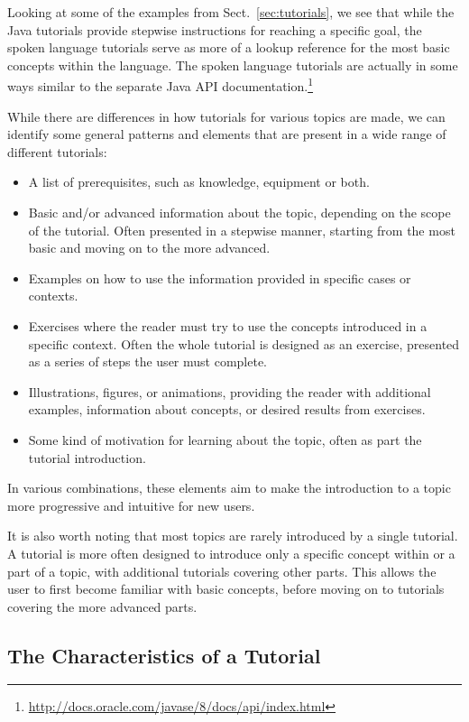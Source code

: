 \noindent
Looking at some of the examples from Sect.~\ref{sec:tutorials}, we see that while the Java tutorials provide stepwise instructions for reaching a specific goal, the spoken language tutorials serve as more of a lookup reference for the most basic concepts within the language. The spoken language tutorials are actually in some ways similar to the separate Java API documentation.\footnote{\url{http://docs.oracle.com/javase/8/docs/api/index.html}}

\noindent
While there are differences in how tutorials for various topics are made, we can identify some general patterns and elements that are present in a wide range of different tutorials:
\begin{itemize}
	\item A list of prerequisites, such as knowledge, equipment or both.
	\item Basic and/or advanced information about the topic, depending on the scope of the tutorial. Often presented in a stepwise manner, starting from the most basic and moving on to the more advanced.
	\item Examples on how to use the information provided in specific cases or contexts.
	\item Exercises where the reader must try to use the concepts introduced in a specific context. Often the whole tutorial is designed as an exercise, presented as a series of steps the user must complete.
	\item Illustrations, figures, or animations, providing the reader with additional examples, information about concepts, or desired results from exercises.
	\item Some kind of motivation for learning about the topic, often as part the tutorial introduction.
\end{itemize}

\noindent
In various combinations, these elements aim to make the introduction to a topic more progressive and intuitive for new users.

\noindent
It is also worth noting that most topics are rarely introduced by a single tutorial. A tutorial is more often designed to introduce only a specific concept within or a part of a topic, with additional tutorials covering other parts. This allows the user to first become familiar with basic concepts, before moving on to tutorials covering the more advanced parts.

\subsection{The Characteristics of a Tutorial}
\label{sec:tutorial_characteristics}


